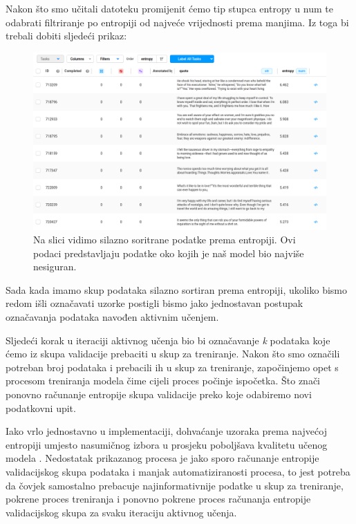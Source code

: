 \documentclass[times, utf8, zavrsni, numeric]{fer}
\begin{document}
Nakon što smo učitali datoteku promijenit ćemo tip stupca \glqq{}entropy\grqq{} u \glqq{}num\grqq{} te odabrati filtriranje po entropiji od najveće vrijednosti prema manjima. Iz toga bi trebali dobiti sljedeći prikaz:

\begin{figure}[H]
    \centering
    \includegraphics[width=\textwidth]{pictures/entropija_filtrirano.png}
    \caption{Na slici vidimo silazno soritrane podatke prema entropiji. Ovi podaci predstavljaju podatke oko kojih je naš model bio najviše nesiguran.}
    \label{entropija_filtrirano}
\end{figure}

Sada kada imamo skup podataka silazno sortiran prema entropiji, ukoliko bismo redom išli označavati uzorke postigli bismo jako jednostavan postupak označavanja podataka navođen aktivnim učenjem.

Sljedeći korak u iteraciji aktivnog učenja bio bi označavanje \textit{k} podataka koje ćemo iz skupa validacije prebaciti u skup za treniranje. Nakon što smo označili potreban broj podataka i prebacili ih u skup za treniranje, započinjemo opet s procesom treniranja modela čime cijeli proces počinje ispočetka. Što znači ponovno računanje entropije skupa validacije preko koje odabiremo novi podatkovni upit. 

Iako vrlo jednostavno u implementaciji, dohvaćanje uzoraka prema najvećoj entropiji umjesto nasumičnog izbora u prosjeku poboljšava kvalitetu učenog modela \citep{seung1992query}. Nedostatak prikazanog procesa je jako sporo računanje entropije validacijskog skupa podataka i manjak automatiziranosti procesa, to jest potreba da čovjek samostalno prebacuje najinformativnije podatke u skup za treniranje, pokrene proces treniranja i ponovno pokrene proces računanja entropije validacijskog skupa za svaku iteraciju aktivnog učenja.
\end{document}
